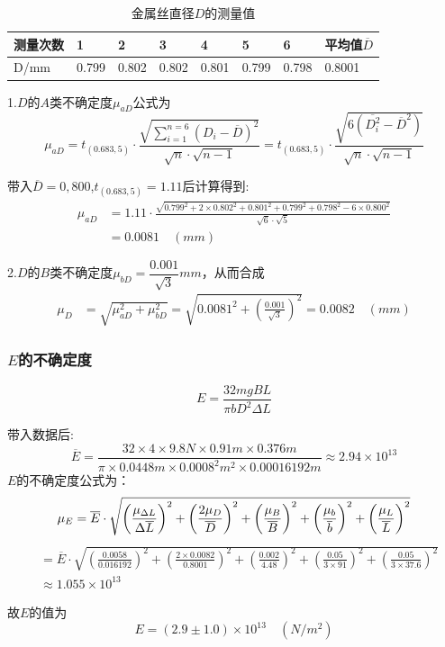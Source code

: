\documentclass[UTF8]{article} %
\begin{document}
\begin{table}[h]
	\centering
	\begin{tabular}{|l|l|l|l|l|l|l|l|}
	\hline
	测量次数 & 1     & 2     & 3     & 4     & 5     & 6     & 平均值$\overline{D}$      \\ \hline
	D/mm & 0.799 & 0.802 & 0.802 & 0.801 & 0.799 & 0.798 & 0.8001 \\ \hline
	\end{tabular}
\caption{金属丝直径$D$的测量值}
\end{table}
\par 1.$D$的$A$类不确定度$\mu_{aD}$公式为
\[ \mu_{aD}=t_{(0.683,5)}\cdot\frac{\sqrt{\sum_{i=1}^{n=6}(D_i-\overline{D})^2}}{\sqrt{n}\cdot\sqrt{n-1}}=t_{(0.683,5)}\cdot\frac{\sqrt{6(\overline{D_i^2}-\overline{D}^2)}}{\sqrt{n}\cdot\sqrt{n-1}}\]
\par 带入$\overline{D}=0,800$,\quad$t_{(0.683,5)}=1.11$后计算得到:
\begin{align*}
	\mu_{aD}&=1.11\cdot \frac{\sqrt{0.799^2+2\times0.802^2+0.801^2+0.799^2+0.798^2-6\times0.800^2}}{\sqrt{6}\cdot\sqrt{5}}\\
		&=0.0081\quad (mm)
\end{align*}
\par 2.$D$的$B$类不确定度$\mu_{bD}=\dfrac{0.001}{\sqrt{3}}mm$，从而合成
\begin{align*}
	\mu_D &= \sqrt{\mu_{aD}^2+\mu_{bD}^2} = \sqrt{0.0081^2+\left(\frac{0.001}{\sqrt{3}}\right)^2} = 0.0082 \quad (mm)
\end{align*}
\subsubsection*{$E$的不确定度}
\[E=\frac{32mgBL}{\pi bD^2\Delta L}\]
\par 带入数据后:
\clearpage
\[\overline{E} = \frac{32\times4\times9.8N\times0.91m\times0.376m}{\pi\times0.0448m\times0.0008^2m^2\times0.00016192m}\approx2.94\times10^{13}\]
$E$的不确定度公式为：
\[	\mu_E = \overline{E}\cdot\sqrt{\left(\frac{\mu_{\Delta L}}{\Delta \overline{L} }\right)^2+\left(\frac{2\mu_{D}}{\overline{D} }\right)^2+\left(\frac{\mu_{B }}{\overline{B} }\right)^2+\left(\frac{\mu_{b}}{\overline{b} }\right)^2+\left(\frac{\mu_{L}}{\overline{L} }\right)^2}\\\]
\begin{align*}
	&=\overline{E}\cdot\sqrt{\left(\frac{0.0058}{0.016192}\right)^2+\left(\frac{2\times0.0082}{0.8001}\right)^2+\left(\frac{0.002}{4.48}\right)^2+\left(\frac{0.05}{3\times91}\right)^2+\left(\frac{0.05}{3\times37.6}\right)^2}\\
	&\approx1.055\times10^{13}
\end{align*}
\par 故$E$的值为
\[E = (2.9\pm1.0)\times10^{13}\quad (N/m^2)\] 
\end{document}
